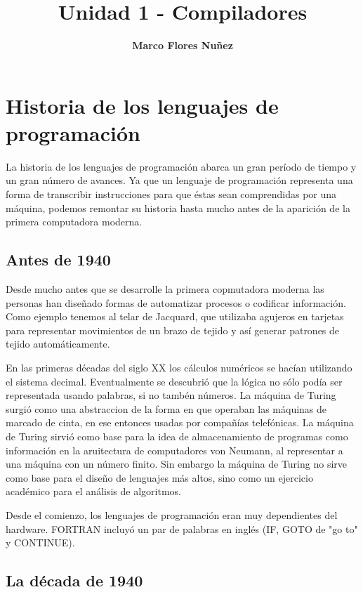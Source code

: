 \documentclass[a4paper,10pt]{article}
\title{Unidad 1 - Compiladores}
\author{\textbf{Marco Flores Nuñez}}
\begin{document}
\maketitle

\section{Historia de los lenguajes de programación}

La historia de los lenguajes de programación abarca un gran período de tiempo y un gran número de avances. Ya que un lenguaje de programación representa una forma de transcribir instrucciones para que éstas sean comprendidas por una máquina, podemos remontar su historia hasta mucho antes de la aparición de la primera computadora moderna.

\subsection{Antes de 1940}

Desde mucho antes que se desarrolle la primera copmutadora moderna las personas han diseñado formas de automatizar procesos o codificar información. Como ejemplo tenemos al telar de Jacquard, que utilizaba agujeros en tarjetas para representar movimientos de un brazo de tejido y así generar patrones de tejido automáticamente.

En las primeras décadas del siglo XX los cálculos numéricos se hacían utilizando el sistema decimal. Eventualmente se descubrió que la lógica no sólo podía ser representada usando palabras, si no tambén números. La máquina de Turing surgió como una abstraccion de la forma en que operaban las máquinas de marcado de cinta, en ese entonces usadas por compañías telefónicas. La máquina de Turing sirvió como base para la idea de almacenamiento de programas como información en la aruitectura de computadores von Neumann, al representar a una máquina con un número finito.  Sin embargo la máquina de Turing no sirve como base para el diseño de lenguajes más altos, sino como un ejercicio académico para el análisis de algoritmos.

Desde el comienzo, los lenguajes de programación eran muy dependientes del hardware. FORTRAN incluyó un par de palabras en inglés (IF, GOTO de "go to" y CONTINUE).

\subsection{La década de 1940}
\end{document}
